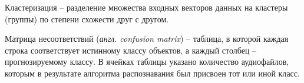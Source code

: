 \begin{enumdescript}
	\item[Кластеризация] -- разделение множества входных векторов данных на кластеры (группы) по степени схожести друг с другом.
	\item [Матрица несоответствий] (\textit{англ. confusion matrix}) -- таблица, в которой каждая строка соответствует истинному классу объектов, а каждый столбец -- прогнозируемому классу. В ячейках таблицы указано количество аудиофайлов, которым в результате алгоритма распознавания был присвоен тот или иной класс.
\end{enumdescript}
